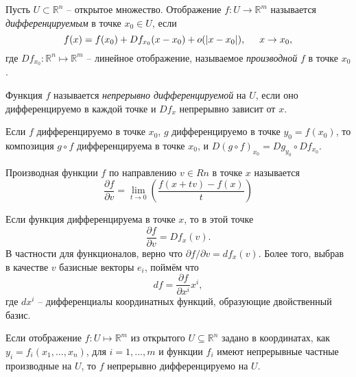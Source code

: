 \begin{to_def} 
    Пусть $U \subset \mathbb{R}^n$ -- открытое множество. Отображение $f \colon U \to \mathbb{R}^m$ называется \textit{дифференцируемым} в точке $x_0 \in U$, если
    \begin{equation*}
        f(x) = f(x_0) + Df_{x_0} (x - x_0) + o(|x-x_0|), \hspace{0.5cm} x \to x_0,
    \end{equation*} 
    где $Df_{x_0} \colon \mathbb{R}^n \mapsto \mathbb{R}^m$ -- линейное отображение, называемое \textit{производной} $f$ в точке $x_0$.  
\end{to_def}

\begin{to_def} 
    Функция $f$ называется \textit{непрерывно дифференцируемой} на $U$, если оно  дифференцируемо в каждой точке и $Df_x$ непрерывно зависит от $x$.
\end{to_def}

\begin{to_thr}
     Если $f$ дифференцируемо в точке $x_0$, $g$ дифференцируемо в точке $y_0 = f(x_0)$, то композиция $g \circ f$ дифференцируема в точке $x_0$, и $D(g \circ f)_{x_0} = Dg_{y_0} \circ Df_{x_0}$.
\end{to_thr}


\begin{to_def} 
    Производная функции $f$ по направлению $v \in Rn$ в точке $x$ называется
    \begin{equation*}
         \frac{\partial f}{\partial v} = 
         \lim_{t \to 0}
         \left(\frac{f(x + t v) - f(x)}{t} \right)
     \end{equation*} 
\end{to_def}

\begin{to_lem} 
    Если функция дифференцируема в точке $x$, то в этой точке
    \begin{equation*}
         \frac{\partial f}{\partial v} = Df_x (v).
     \end{equation*} 
     В частности для функционалов, верно что $\partial f / \partial v = df_x (v)$. Более того, выбрав в качестве $v$ базисные векторы $e_i$, поймём что
     \begin{equation*}
         df = \frac{\partial f}{\partial x^i} x^i,
     \end{equation*}
     где $dx^i$ -- дифференциалы координатных функций, образующие двойственный базис.
\end{to_lem}

\begin{to_thr} 
    Если отображение $f \colon U \mapsto \mathbb{R}^m$ из открытого $U \subseteq \mathbb{R}^n$ задано в координатах, как $y_i = f_i(x_1, \ldots, x_n)$, для $i = 1,\ldots,m$ и функции $f_i$ имеют непрерывные частные производные на $U$, то $f$ непрерывно дифференцируемо на $U$. 
\end{to_thr}